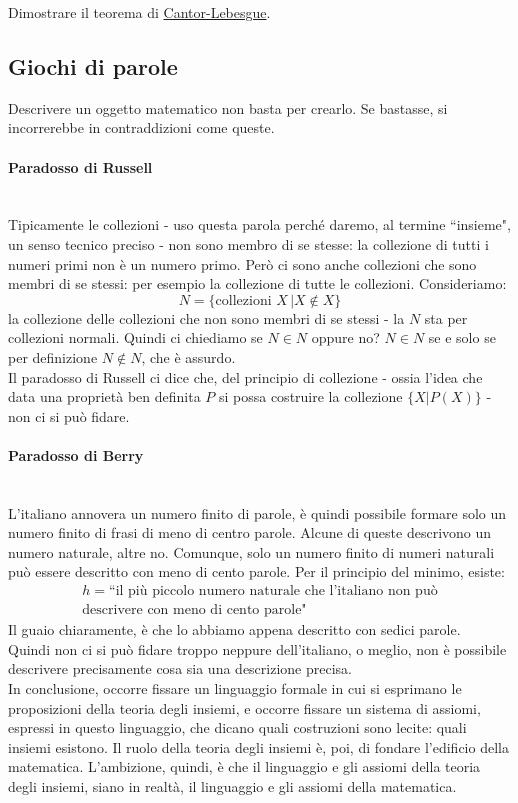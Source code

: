 \documentclass[11pt]{scrartcl}
\begin{document}
\begin{exercise}
Dimostrare il teorema di \hyperref[CL]{Cantor-Lebesgue}.
\end{exercise}

\subsection{Giochi di parole}
Descrivere un oggetto matematico non basta per crearlo. Se bastasse, si incorrerebbe in contraddizioni come queste.
\paragraph*{Paradosso di Russell}\mbox{}\\
Tipicamente le collezioni - uso questa parola perché daremo, al termine ``insieme", un senso tecnico preciso - non sono membro di se stesse: la collezione di 
tutti i numeri primi non è un numero primo. Però ci sono anche collezioni che sono membri di se stessi: per esempio la collezione di tutte le collezioni. Consideriamo:
\[ N = \{\text{collezioni $X$}\, | X \not\in X \}
	\]
la collezione delle collezioni che non sono membri di se stessi - la $N$ sta per collezioni normali. Quindi ci chiediamo se $N \in N$ oppure no? $N \in N$ se e solo se per definizione $N \not \in N$, che è assurdo.\\
Il paradosso di Russell ci dice che, del principio di collezione - ossia l'idea che data una proprietà ben definita $P$ si possa costruire la collezione $\{X | P(X)\}$ - non ci si può fidare.

\paragraph*{Paradosso di Berry}\mbox{}\\
L'italiano annovera un numero finito di parole, è quindi possibile formare solo un numero finito di frasi di meno di centro parole. Alcune di queste descrivono un numero naturale, altre no. Comunque, solo un numero 
finito di numeri naturali può essere descritto con meno di cento parole. Per il principio del minimo, esiste:
\begin{align*}
	h = \text{``il più piccolo numero naturale che l'italiano non può} \\ 
 \text{descrivere con meno di cento parole"}
\end{align*}
Il guaio chiaramente, è che lo abbiamo appena descritto con sedici parole.\\
Quindi non ci si può fidare troppo neppure dell'italiano, o meglio, non è possibile descrivere precisamente cosa sia una descrizione precisa.\\
In conclusione, occorre fissare un linguaggio formale in cui si esprimano le proposizioni della teoria degli insiemi, e occorre fissare un sistema di assiomi, espressi in questo linguaggio, che 
dicano quali costruzioni sono lecite: quali insiemi esistono. Il ruolo della teoria degli insiemi è, poi, di fondare l'edificio della matematica. L'ambizione, quindi, è che il linguaggio e gli assiomi della teoria degli insiemi, 
siano in realtà, il linguaggio e gli assiomi della matematica.
\end{document}
